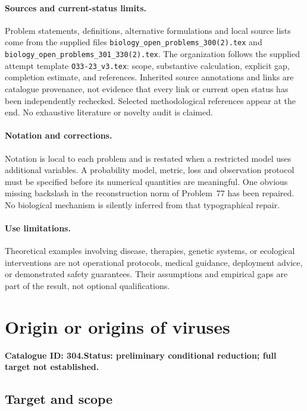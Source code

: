 \documentclass[11pt]{article}
\begin{document}
\paragraph{Sources and current-status limits.}
Problem statements, definitions, alternative formulations and local source lists
come from the supplied files
\texttt{biology\_open\_problems\_300(2).tex} and
\texttt{biology\_open\_problems\_301\_330(2).tex}.
The organization follows the supplied attempt template
\texttt{O33-23\_v3.tex}: scope, substantive calculation, explicit gap,
completion estimate, and references. Inherited source annotations and links are
catalogue provenance, not evidence that every link or current open status has
been independently rechecked. Selected methodological references appear at the
end. No exhaustive literature or novelty audit is claimed.

\paragraph{Notation and corrections.}
Notation is local to each problem and is restated when a restricted model uses
additional variables. A probability model, metric, loss and observation protocol
must be specified before its numerical quantities are meaningful. One obvious
missing backslash in the reconstruction norm of Problem~77 has been repaired.
No biological mechanism is silently inferred from that typographical repair.

\paragraph{Use limitations.}
Theoretical examples involving disease, therapies, genetic systems, or ecological
interventions are not operational protocols, medical guidance, deployment advice,
or demonstrated safety guarantees. Their assumptions and empirical gaps are part
of the result, not optional qualifications.

\setcounter{section}{303}
\section{Origin or origins of viruses}
\label{prob:304}
\noindent\textbf{Catalogue ID: 304.}\quad \textbf{Status: preliminary conditional reduction; full target not established.}
\subsection{Target and scope}
\end{document}
